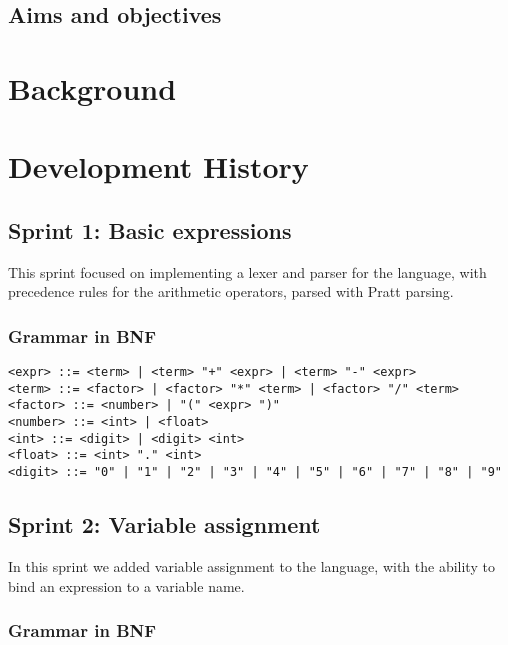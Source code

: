 \documentclass[a4paper, oneside, 11pt]{report}
\begin{document}
\section{Aims and objectives}\label{sec:aims-and-objectives}

\chapter{Background}\label{ch:background}

\chapter{Development History}\label{ch:devhist}

\section{Sprint 1: Basic expressions}\label{sec:sprint-1:-basic-expressions}

This sprint focused on implementing a lexer and parser for the language, with precedence rules for the arithmetic 
operators, parsed with Pratt parsing.

\subsection{Grammar in BNF}\label{subsec:grammar-in-bnf1}

\begin{verbatim}
<expr> ::= <term> | <term> "+" <expr> | <term> "-" <expr>
<term> ::= <factor> | <factor> "*" <term> | <factor> "/" <term>
<factor> ::= <number> | "(" <expr> ")"
<number> ::= <int> | <float>
<int> ::= <digit> | <digit> <int>
<float> ::= <int> "." <int>
<digit> ::= "0" | "1" | "2" | "3" | "4" | "5" | "6" | "7" | "8" | "9"
\end{verbatim}

\section{Sprint 2: Variable assignment}\label{sec:variable-assignment}

In this sprint we added variable assignment to the language, with the ability to bind an expression to a variable name.

\subsection{Grammar in BNF}\label{subsec:grammar-in-bnf2}
\end{document}
